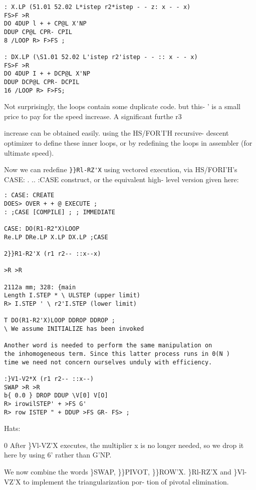 {{\begin{verbatim}
: X.LP (51.01 52.02 L*istep r2*istep - - z: x - - x)
FS>F >R
DO 4DUP l + + CP@L X'NP
DDUP CP@L CPR- CPIL
8 /LOOP R> F>FS ;

: DX.LP (\S1.01 52.02 L'istep r2'istep - - :: x - - x)
FS>F >R
DO 4DUP I + + DCP@L X'NP
DDUP DCP@L CPR- DCPIL
16 /LOOP R> F>FS;
\end{verbatim} 

Not surprisingly, the loops contain some duplicate code. but this- '
is a small price to pay for the speed increase. A significant furthe r3

 


increase can be obtained easily. using the HS/FOR'I'H recursive-
descent optimizer to define these inner loops, or by redefining
the loops in assembler (for ultimate speed).

Now we can redefine \verb|}}Rl-RZ'X| using vectored execution, via
HS/FORI'H's CASE: . .. :CASE construct, or the equivalent high-
level version given here:

\begin{verbatim}
: CASE: CREATE
DOES> OVER + + @ EXECUTE ;
: ;CASE [COMPILE] ; ; IMMEDIATE

CASE: DO(R1-R2"X)LOOP
Re.LP DRe.LP X.LP DX.LP ;CASE

2}}R1-R2'X (r1 r2-- ::x--x)

>R >R

2112a mm; 328: {main
Length I.STEP * \ ULSTEP (upper limit)
R> I.STEP ' \ r2'I.STEP (lower limit)

T DO(R1-R2'X)LOOP DDROP DDROP ;
\ We assume INITIALIZE has been invoked

Another word is needed to perform the same manipulation on
the inhomogeneous term. Since this latter process runs in 0(N )
time we need not concern ourselves unduly with efficiency.

:}V1-V2*X (r1 r2-- ::x--)
SWAP >R >R
b{ 0.0 } DROP DDUP \V[0] V[O]
R> irowilSTEP' + >FS G'
R> row ISTEP " + DDUP >FS GR- FS> ;

\end{verbatim} 
Hats:

0 After \}Vl-VZ'X executes, the multiplier x is no longer needed,
so we drop it here by using 6' rather than G'NP.

We now combine the words \}SWAP, \}\}PIVOT, \}\}ROW'X.
\}Rl-RZ'X and \}Vl-VZ'X to implement the triangularization por-
tion of pivotal elimination.


}}
